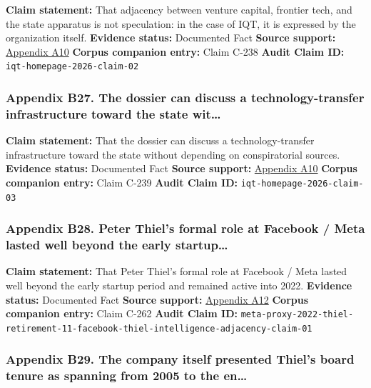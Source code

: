 \documentclass[
  american,
  11pt,
  letterpaper,
]{article}
\begin{document}
\textbf{Claim statement:} That adjacency between venture capital,
frontier tech, and the state apparatus is not speculation: in the case
of IQT, it is expressed by the organization itself. \textbf{Evidence
status:} Documented Fact \textbf{Source support:}
\hyperref[appendix-a10-in-q-tel]{Appendix A10} \textbf{Corpus companion
entry:} Claim C-238 \textbf{Audit Claim ID:}
\texttt{iqt-homepage-2026-claim-02}

\subsubsection{Appendix B27. The dossier can discuss a
technology-transfer infrastructure toward the state
wit\ldots{}}\label{appendix-b27-the-dossier-can-discuss-a-technology-transfer-infrastructure-toward-the-state-wit}

\textbf{Claim statement:} That the dossier can discuss a
technology-transfer infrastructure toward the state without depending on
conspiratorial sources. \textbf{Evidence status:} Documented Fact
\textbf{Source support:} \hyperref[appendix-a10-in-q-tel]{Appendix A10}
\textbf{Corpus companion entry:} Claim C-239 \textbf{Audit Claim ID:}
\texttt{iqt-homepage-2026-claim-03}

\subsubsection{Appendix B28. Peter Thiel's formal role at Facebook /
Meta lasted well beyond the early
startup\ldots{}}\label{appendix-b28-peter-thiel-s-formal-role-at-facebook-meta-lasted-well-beyond-the-early-startup}

\textbf{Claim statement:} That Peter Thiel's formal role at Facebook /
Meta lasted well beyond the early startup period and remained active
into 2022. \textbf{Evidence status:} Documented Fact \textbf{Source
support:}
\hyperref[appendix-a12-meta-platforms-inc-2022-definitive-proxy-statement]{Appendix
A12} \textbf{Corpus companion entry:} Claim C-262 \textbf{Audit Claim
ID:}
\texttt{meta-proxy-2022-thiel-retirement-11-facebook-thiel-intelligence-adjacency-claim-01}

\subsubsection{Appendix B29. The company itself presented Thiel's board
tenure as spanning from 2005 to the
en\ldots{}}\label{appendix-b29-the-company-itself-presented-thiel-s-board-tenure-as-spanning-from-2005-to-the-en}
\end{document}
